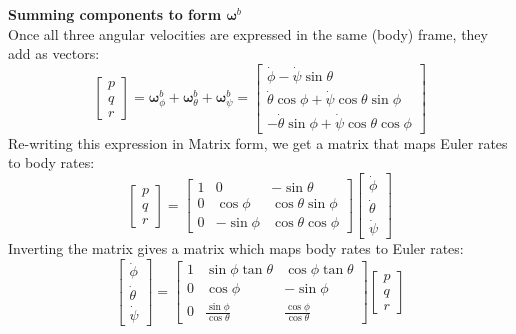 \documentclass[conf]{new-aiaa}
\begin{document}
\textbf{Summing components to form $\boldsymbol{\omega}^b$}\\
\noindent Once all three angular velocities are expressed in the same (body) frame, they add as vectors:
$$\begin{bmatrix} p \\ q \\ r \end{bmatrix} = \boldsymbol{\omega}_{\phi}^b + \boldsymbol{\omega}_{\theta}^b + \boldsymbol{\omega}_{\psi}^b = \begin{bmatrix} \dot{\phi} - \dot{\psi}\sin\theta \\ \dot{\theta}\cos\phi + \dot{\psi}\cos\theta\sin\phi \\ -\dot{\theta}\sin\phi + \dot{\psi}\cos\theta\cos\phi \end{bmatrix}$$
Re-writing this expression in Matrix form, we get a matrix that maps Euler rates to body rates:
$$\begin{bmatrix} p \\ q \\ r \end{bmatrix} = \begin{bmatrix} 1 & 0 & -\sin\theta \\ 0 & \cos\phi & \cos\theta\sin\phi \\ 0 & -\sin\phi & \cos\theta\cos\phi \end{bmatrix} \begin{bmatrix} \dot{\phi} \\ \dot{\theta} \\ \dot{\psi} \end{bmatrix}$$
Inverting the matrix gives a matrix which maps body rates to Euler rates: 
\begin{equation}\begin{bmatrix} \dot{\phi} \\ \dot{\theta} \\ \dot{\psi} \end{bmatrix} = \begin{bmatrix} 1 & \sin\phi\tan\theta & \cos\phi\tan\theta \\ 0 & \cos\phi & -\sin\phi \\ 0 & \frac{\sin\phi}{\cos\theta} & \frac{\cos\phi}{\cos\theta} \end{bmatrix}\begin{bmatrix} p \\ q \\ r \end{bmatrix}\label{eq:InvKin}\end{equation}
\end{document}
